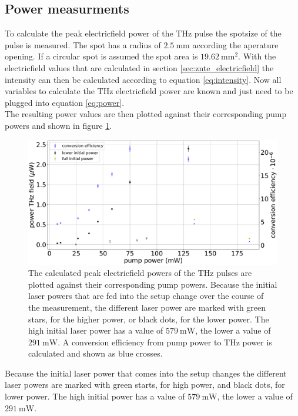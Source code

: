 \subsection{Power measurments}
\FloatBarrier
To calculate the peak electricfield power of the $\si{\tera\hertz}$ pulse the spotsize of the pulse is measured.
The spot has a radius of $\SI{2.5}{\milli\meter}$ according the aperature opening.
If a circular spot is assumed the spot area is $\SI{19.62}{\milli\meter\squared}$.
With the electricfield values that are calculated in section \ref{sec:znte_electricfield} the intensity can then be calculated according to equation \ref{eq:intensity}.
Now all variables to calculate the $\si{\tera\hertz}$ electricfield power are known and just need to be plugged into equation \ref{eq:power}.
\\
The resulting power values are then plotted against their corresponding pump powers and shown in figure \ref{fig:znte_power}.
\begin{figure}
    \centering
    \includegraphics[width=\textwidth]{Plots/Powerznte.pdf}
    \caption{The calculated peak electricfield powers of the $\si{\tera\hertz}$ pulses are plotted against their corresponding pump powers.
    Because the initial laser powers that are fed into the setup change over the course of the measurement, the different laser power are marked with green stars, for the higher power, or black dots, for the lower power.
    The high initial laser power has a value of $\SI{579}{\milli\W}$, the lower a value of $\SI{291}{\milli\W}$.
    A conversion efficiency from pump power to $\si{\tera\hertz}$ power is calculated and shown as blue crosses.}
    \label{fig:znte_power}
\end{figure}
Because the initial laser power that comes into the setup changes the different laser powers are marked with green starts, for high power, and black dots, for lower power.
The high initial power has a value of $\SI{579}{\milli\W}$, the lower a value of $\SI{291}{\milli\W}$.
